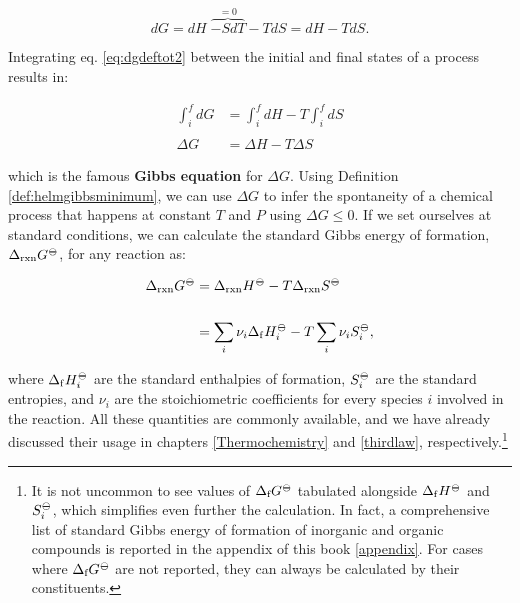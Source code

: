 \documentclass[
  9pt,
]{extbook}
\theoremstyle{definition}
\theoremstyle{definition}
\theoremstyle{definition}
\theoremstyle{definition}
\theoremstyle{remark}
\begin{document}
\begin{equation}
dG = dH \; \overbrace{-SdT}^{=0} -TdS = dH -TdS.
\label{eq:dgdeftot2}
\end{equation}

Integrating eq. \eqref{eq:dgdeftot2} between the initial and final states of a process results in:

\begin{equation}
\begin{aligned}
\int_i^f dG &= \int_i^f dH -T \int_i^f dS \\
\\
\Delta G &= \Delta H -T \Delta S
\end{aligned}
\label{eq:gibbseq}
\end{equation}

which is the famous \textbf{Gibbs equation} for \(\Delta G\). Using Definition \ref{def:helmgibbsminimum}, we can use \(\Delta G\) to infer the spontaneity of a chemical process that happens at constant \(T\) and \(P\) using \(\Delta G \leq 0\). If we set ourselves at standard conditions, we can calculate the standard Gibbs energy of formation, \(\Delta_{\text{rxn}} G^{-\kern-6pt{\ominus}\kern-6pt-}\), for any reaction as:

\begin{equation}
\begin{aligned}
\Delta_{\text{rxn}} G^{-\kern-6pt{\ominus}\kern-6pt-}&= \Delta_{\text{rxn}} H^{-\kern-6pt{\ominus}\kern-6pt-}-T \Delta_{\text{rxn}} S^{-\kern-6pt{\ominus}\kern-6pt-}\\
\\
&= \sum_i \nu_i \Delta_{\mathrm{f}} H_i^{-\kern-6pt{\ominus}\kern-6pt-}- T \sum_i \nu_i S_i^{-\kern-6pt{\ominus}\kern-6pt-},
\end{aligned}
\label{eq:gibbseq2}
\end{equation}

where \(\Delta_{\mathrm{f}} H_i^{-\kern-6pt{\ominus}\kern-6pt-}\) are the standard enthalpies of formation, \(S_i^{-\kern-6pt{\ominus}\kern-6pt-}\) are the standard entropies, and \(\nu_i\) are the stoichiometric coefficients for every species \(i\) involved in the reaction. All these quantities are commonly available, and we have already discussed their usage in chapters \ref{Thermochemistry} and \ref{thirdlaw}, respectively.\footnote{It is not uncommon to see values of \(\Delta_{\text{f}} G^{-\kern-6pt{\ominus}\kern-6pt-}\) tabulated alongside \(\Delta_{\mathrm{f}} H^{-\kern-6pt{\ominus}\kern-6pt-}\) and \(S_i^{-\kern-6pt{\ominus}\kern-6pt-}\), which simplifies even further the calculation. In fact, a comprehensive list of standard Gibbs energy of formation of inorganic and organic compounds is reported in the appendix of this book \ref{appendix}. For cases where \(\Delta_{\text{f}} G^{-\kern-6pt{\ominus}\kern-6pt-}\) are not reported, they can always be calculated by their constituents.}
\end{document}

